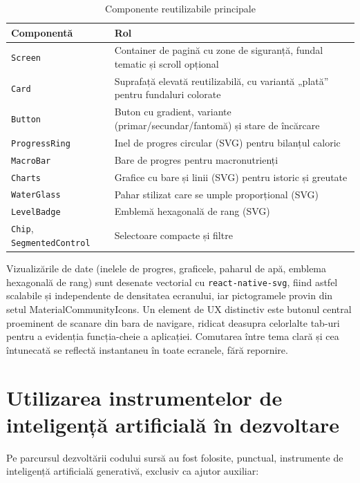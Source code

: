 \documentclass[12pt, a4paper, twoside]{report}
\numberwithin{equation}{section}
\begin{document}
\begin{table}[H]
\centering
\caption{Componente reutilizabile principale}
\label{tab:componente}
\begin{tabularx}{\textwidth}{lX}
\toprule
\textbf{Componentă} & \textbf{Rol} \\
\midrule
\texttt{Screen} & Container de pagină cu zone de siguranță, fundal tematic și scroll opțional \\
\texttt{Card} & Suprafață elevată reutilizabilă, cu variantă „plată'' pentru fundaluri colorate \\
\texttt{Button} & Buton cu gradient, variante (primar/secundar/fantomă) și stare de încărcare \\
\texttt{ProgressRing} & Inel de progres circular (SVG) pentru bilanțul caloric \\
\texttt{MacroBar} & Bare de progres pentru macronutrienți \\
\texttt{Charts} & Grafice cu bare și linii (SVG) pentru istoric și greutate \\
\texttt{WaterGlass} & Pahar stilizat care se umple proporțional (SVG) \\
\texttt{LevelBadge} & Emblemă hexagonală de rang (SVG) \\
\texttt{Chip}, \texttt{SegmentedControl} & Selectoare compacte și filtre \\
\bottomrule
\end{tabularx}
\end{table}

Vizualizările de date (inelele de progres, graficele, paharul de apă, emblema hexagonală de
rang) sunt desenate vectorial cu \texttt{react-native-svg}, fiind astfel scalabile și
independente de densitatea ecranului, iar pictogramele provin din setul MaterialCommunityIcons.
Un element de UX distinctiv este butonul central proeminent de scanare din bara de navigare,
ridicat deasupra celorlalte tab-uri pentru a evidenția funcția-cheie a aplicației. Comutarea
între tema clară și cea întunecată se reflectă instantaneu în toate ecranele, fără repornire.

\section{Utilizarea instrumentelor de inteligență artificială în dezvoltare}

Pe parcursul dezvoltării codului sursă au fost folosite, punctual, instrumente de
inteligență artificială generativă, exclusiv ca ajutor auxiliar:
\end{document}
